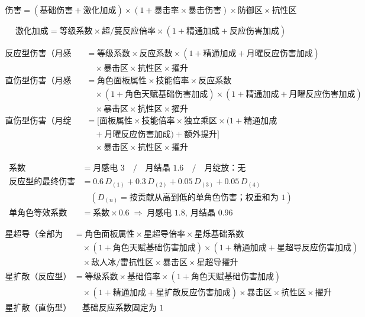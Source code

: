 
\[
\text{伤害} = (\text{基础伤害} + \text{激化加成}) \times (1 + \text{暴击率} \times \text{暴击伤害})
\times \text{防御区} \times \text{抗性区}
\]

\[
\text{激化加成} = \text{等级系数} \times \text{超/蔓反应倍率} \times (1 + \text{精通加成} + \text{反应伤害加成})
\]


\[
\begin{aligned}
\text{反应型伤害（月感电／月结晶）} &= \text{等级系数} \times \text{反应系数} \times (1 + \text{精通加成} + \text{月曜反应伤害加成}) \\
&\quad \times \text{暴击区} \times \text{抗性区} \times \text{擢升} \\
\text{直伤型伤害（月感电／月结晶）} &= \text{角色面板属性} \times \text{技能倍率} \times \text{反应系数} \\
&\quad \times (1 + \text{角色天赋基础伤害加成}) \times (1 + \text{精通加成} + \text{月曜反应伤害加成}) \\
&\quad \times \text{暴击区} \times \text{抗性区} \times \text{擢升} \\
\text{直伤型伤害（月绽放）} &= \big[ \text{面板属性} \times \text{技能倍率} \times \text{独立乘区} \times (1 + \text{精通加成} \\
&\quad + \text{月曜反应伤害加成}) + \text{额外提升} \big] \\
&\quad \times \text{暴击区} \times \text{抗性区} \times \text{擢升}
\end{aligned}
\]

\[
\begin{aligned}
\text{系数} &= \text{月感电 } 3 \quad / \quad \text{月结晶 } 1.6 \quad / \quad \text{月绽放：无} \\
\text{反应型的最终伤害} &= 0.6\,D_{(1)} + 0.3\,D_{(2)} + 0.05\,D_{(3)} + 0.05\,D_{(4)} \\
&\quad (D_{(n)} = \text{按贡献从高到低的单角色伤害；权重和为 } 1) \\
\text{单角色等效系数} &= \text{系数} \times 0.6 \;\Rightarrow\; \text{月感电 } 1.8,\ \text{月结晶 } 0.96
\end{aligned}
\]


{\footnotesize
\[
\begin{aligned}
\text{星超导（全部为直伤型）} &= \text{角色面板属性} \times \text{星超导倍率} \times \text{星烁基础系数} \\
&\quad \times (1 + \text{角色天赋基础伤害加成}) \times (1 + \text{精通加成} + \text{星超导反应伤害加成}) \\
&\quad \times \text{敌人冰/雷抗性区} \times \text{暴击区} \times \text{星超导擢升} \\[.4em]
\text{星扩散（反应型）} &= \text{等级系数} \times \text{基础倍率} \times (1 + \text{角色天赋基础伤害加成}) \\
&\quad \times (1 + \text{精通加成} + \text{星扩散反应伤害加成}) \times \text{暴击区} \times \text{抗性区} \times \text{擢升} \\
\text{星扩散（直伤型）} &\quad \text{基础反应系数固定为 } 1
\end{aligned}
\]}

